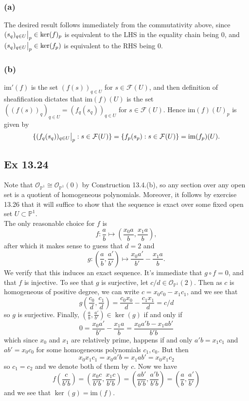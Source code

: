 \documentclass{article}
\newcommand\restr[2]{{%
  \left.\kern-\nulldelimiterspace %
  #1 %
  \vphantom{\big|} %
  \right|_{#2} %
  }}
\theoremstyle{definition}
\renewcommand{\P}{\mathbb{P}}
\newcommand{\im}{\text{im}}
\begin{document}
\subsubsection*{(a)}

The desired result follows immediately from the commutativity above, since
$\restr{(s_q)_{q \in U}}{p} \in \ker(f)_p$ is equivalent to the LHS in the
equality chain being $0$, and $\restr{(s_q)_{q \in U}}{p} \in \ker (f_p)$ is
equivalent to the RHS being $0$.

\subsubsection*{(b)}

$\im'(f)$ is the set $(f(s))_{q \in U}$ for $s \in \mathcal{F}(U)$, and then
definition of sheafification dictates that $\im(f)(U)$ is the set
$((f(s))_q)_{q \in U} = (f_q(s_q))_{q \in U}$ for $s \in \mathcal{F}(U)$. Hence
$\im(f)(U)_p$ is given by
\[
	\{\restr{(f_q(s_q))_{q \in U}}{p} : s \in \mathcal{F}(U)\} 
	= 
	\{f_p(s_p) : s \in \mathcal{F}(U)\} 
	= 
	\im(f_p)(U).
\]

\subsection*{Ex 13.24}

Note that $\mathcal{O}_{\P^{1}} \cong \mathcal{O}_{\P^{1}}(0)$ by Construction
13.4.(b), so any section over any open set is a quotient of homogeneous
polynomials. Moreover, it follows by exercise 13.26 that it will suffice to
show that the sequence is exact over some fixed open set $U \subset \P^{1}$. \\

The only reasonable choice for $f$ is
\[
	f : \frac{a}{b} \mapsto \left(\frac{x_0 a}{b}, \frac{x_1 a}{b}\right),
\]
after which it makes sense to guess that $d = 2$ and 
\[
	g : \left(\frac{a}{b}, \frac{a'}{b'}\right) 
	\mapsto 
	\frac{x_0 a'}{b'} - \frac{x_1 a}{b}.
\] 
We verify that this induces an exact sequence. It's immediate that $g \circ f =
0$, and that $f$ is injective. To see that $g$ is surjective, let $c/d \in
\mathcal{O}_{\P^{1}}(2)$. Then as $c$ is homogeneous of positive degree, we can
write $c = x_0c_0 - x_1c_1$, and we see that 
\[
	g\left(\frac{c_0}{d}, \frac{c_1}{d}\right)
	=
	\frac{c_0x_0}{d}
	-
	\frac{c_1x_1}{d}
	=
	c/d
\] 
so $g$ is surjective. Finally, $\left(\frac{a}{b}, \frac{a'}{b'}\right) \in \ker(g)$
if and only if 
\[
	0
	=
	\frac{x_0 a'}{b'} - \frac{x_1 a}{b}
	=
	\frac{x_0 a'b - x_1 a b'}{b'b}
\] 
which since $x_0$ and $x_1$ are relatively prime, happens if and only $a'b =
x_1 c_1$ and $a b ' = x_0 c_0$ for some homogeneous polynomials $c_1, c_0$. But then
\[
	x_0 x_1 c_1 = x_0 a'b = x_1 a b' = x_0 x_1 c_2
\]
so $c_1 = c_2$ and we denote both of them by $c$. Now we have
\[
	f\left(\frac{c}{b'b}\right)
	=
	\left(
		\frac{x_0 c}{b'b},
		\frac{x_1 c}{b'b}
	\right)
	=
	\left(
		\frac{ab'}{b'b},
		\frac{a'b}{b'b}
	\right)
	=
	\left(
		\frac{a}{b},
		\frac{a'}{b'}
	\right)
\] 
and we see that $\ker(g) = \im(f)$.
\end{document}
